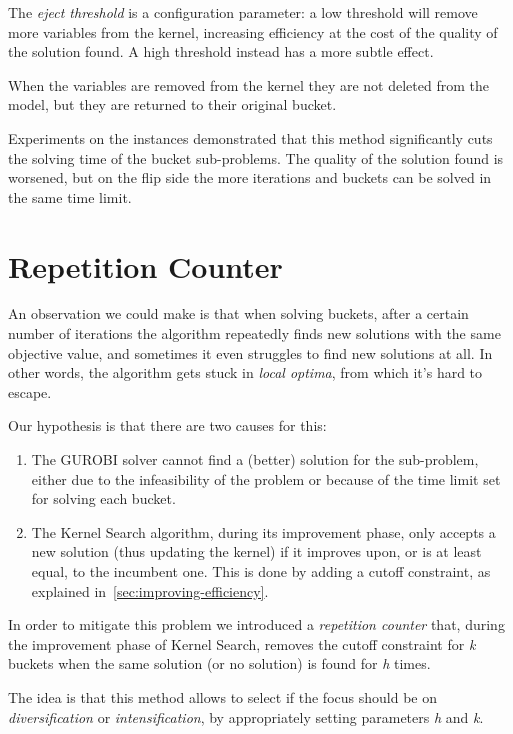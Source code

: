 The \textit{eject threshold} is a configuration parameter:
a low threshold will remove more variables from the kernel, increasing efficiency at the cost of the quality of the solution found.
A high threshold instead has a more subtle effect.

When the variables are removed from the kernel they are not deleted from the model,
but they are returned to their original bucket.

Experiments on the instances demonstrated that this method significantly cuts
the solving time of the bucket sub-problems.
The quality of the solution found is worsened, but on the flip side
the more iterations and buckets can be solved in the same time limit.


\section{Repetition Counter}
An observation we could make is that when solving buckets,
after a certain number of iterations the algorithm
repeatedly finds new solutions with the same objective value,
and sometimes it even struggles to find new solutions at all.
In other words, the algorithm gets stuck in \textit{local optima},
from which it's hard to escape.

Our hypothesis is that there are two causes for this:
\begin{enumerate}
    \item The GUROBI solver cannot find a (better) solution for the sub-problem,
    either due to the infeasibility of the problem or because of
    the time limit set for solving each bucket.
    \item The Kernel Search algorithm, during its improvement phase,
    only accepts a new solution (thus updating the kernel)
    if it improves upon, or is at least equal, to the incumbent one.
    This is done by adding a cutoff constraint, as explained in~\ref{sec:improving-efficiency}.
\end{enumerate}

In order to mitigate this problem we introduced a \textit{repetition counter}
that, during the improvement phase of Kernel Search,
removes the cutoff constraint for \textit{k} buckets
when the same solution (or no solution) is found for \textit{h} times.

The idea is that this method allows to select if the focus should be on
\textit{diversification} or \textit{intensification},
by appropriately setting parameters \textit{h} and \textit{k}.

